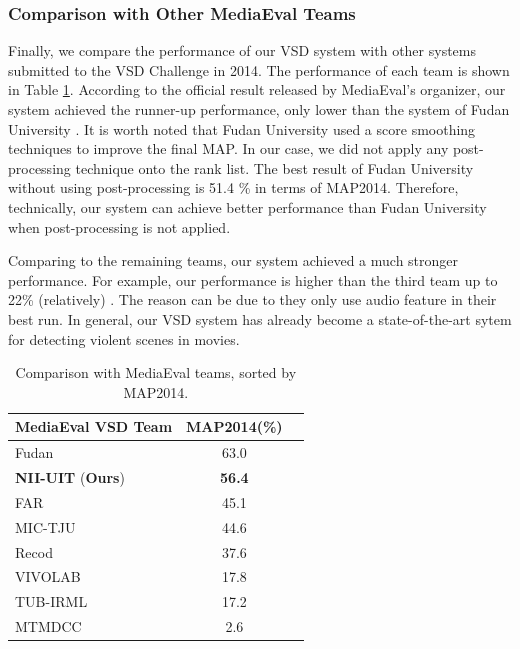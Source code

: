 \documentclass[twocolumn]{bmcart}%
\begin{document}
\subsubsection{Comparison with Other MediaEval Teams}

Finally, we compare the performance of our VSD system with other systems submitted to the VSD Challenge in 2014. The performance of each team is 
shown in Table \ref{tab:mediaeval}. According to the official result released by MediaEval's organizer, our system achieved the runner-up performance, only lower than the system of Fudan University \cite{2014fudan}. It is worth noted that Fudan University used a score smoothing techniques to improve the final MAP. In our case, we did not apply any post-processing technique onto the rank list. The best result of Fudan University without using post-processing is 51.4 \% in terms of MAP2014. Therefore, technically, our system can achieve better performance than Fudan University when post-processing is not applied. 

Comparing to the remaining teams, our system achieved a much stronger performance. For example, our performance is higher than the third team up to 22\% (relatively) \cite{2014far}. The reason can be due to they only use audio feature in their best run. In general, our VSD system has already become a state-of-the-art sytem for detecting violent scenes in movies.
\begin{table}
	\centering
	\caption{Comparison with MediaEval teams, sorted by MAP2014.}
	\begin{tabular}{lcc}
		\hline
		MediaEval VSD Team & MAP2014(\%) \\ \hline
		Fudan \cite{2014fudan} & 63.0 \\
		\textbf{NII-UIT} \cite{2014nii} (\textbf{Ours}) & \textbf{56.4} \\
		FAR \cite{2014far} & 45.1 \\
		MIC-TJU \cite{2014mic} & 44.6 \\
		Recod \cite{avila2014recod} & 37.6 \\
		VIVOLAB \cite{2014vivolab} & 17.8 \\
		TUB-IRML \cite{2014tub} & 17.2 \\
		MTMDCC \cite{2014mtm} & 2.6 \\ \hline
	\end{tabular}%
	\label{tab:mediaeval}%
\end{table}%
\end{document}
